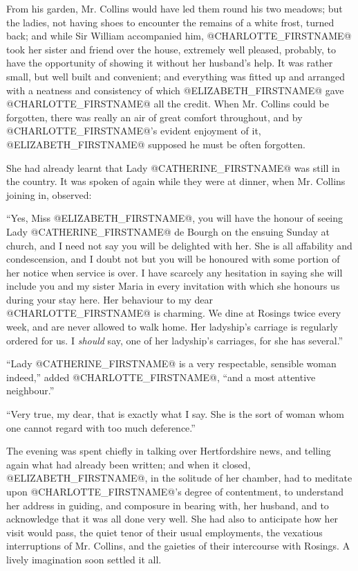 From his garden, Mr. Collins would have led them round his two meadows;
but the ladies, not having shoes to encounter the remains of a white
frost, turned back; and while Sir William accompanied him, @CHARLOTTE_FIRSTNAME@
took her sister and friend over the house, extremely well pleased,
probably, to have the opportunity of showing it without her husband's
help. It was rather small, but well built and convenient; and everything
was fitted up and arranged with a neatness and consistency of which
@ELIZABETH_FIRSTNAME@ gave @CHARLOTTE_FIRSTNAME@ all the credit. When Mr. Collins could be
forgotten, there was really an air of great comfort throughout, and by
@CHARLOTTE_FIRSTNAME@'s evident enjoyment of it, @ELIZABETH_FIRSTNAME@ supposed he must be often
forgotten.

She had already learnt that Lady @CATHERINE_FIRSTNAME@ was still in the country. It
was spoken of again while they were at dinner, when Mr. Collins joining
in, observed:

``Yes, Miss @ELIZABETH_FIRSTNAME@, you will have the honour of seeing Lady @CATHERINE_FIRSTNAME@
de Bourgh on the ensuing Sunday at church, and I need not say you will
be delighted with her. She is all affability and condescension, and I
doubt not but you will be honoured with some portion of her notice
when service is over. I have scarcely any hesitation in saying she
will include you and my sister Maria in every invitation with which she
honours us during your stay here. Her behaviour to my dear @CHARLOTTE_FIRSTNAME@ is
charming. We dine at Rosings twice every week, and are never allowed
to walk home. Her ladyship's carriage is regularly ordered for us. I
\textit{should} say, one of her ladyship's carriages, for she has several.''

``Lady @CATHERINE_FIRSTNAME@ is a very respectable, sensible woman indeed,'' added
@CHARLOTTE_FIRSTNAME@, ``and a most attentive neighbour.''

``Very true, my dear, that is exactly what I say. She is the sort of
woman whom one cannot regard with too much deference.''

The evening was spent chiefly in talking over Hertfordshire news,
and telling again what had already been written; and when it closed,
@ELIZABETH_FIRSTNAME@, in the solitude of her chamber, had to meditate upon
@CHARLOTTE_FIRSTNAME@'s degree of contentment, to understand her address in guiding,
and composure in bearing with, her husband, and to acknowledge that it
was all done very well. She had also to anticipate how her visit
would pass, the quiet tenor of their usual employments, the vexatious
interruptions of Mr. Collins, and the gaieties of their intercourse with
Rosings. A lively imagination soon settled it all.

